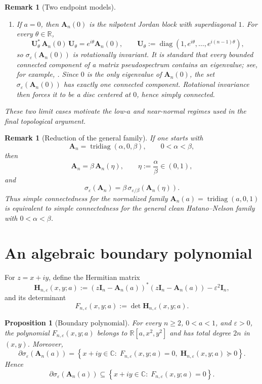 \documentclass[11pt]{article}
\newtheorem{proposition}[theorem]{Proposition}
\newtheorem{remark}[theorem]{Remark}
\DeclareMathOperator{\diag}{diag}
\DeclareMathOperator{\tridiag}{tridiag}
\newcommand{\R}{\mathbb{R}}
\newcommand{\C}{\mathbb{C}}
\begin{document}
\begin{remark}[Two endpoint models]
\begin{enumerate}
\item If \(a=0\), then \(\mathbf A_n(0)\) is the nilpotent Jordan block with superdiagonal \(1\). For every \(\theta\in\R\),
\[
\mathbf U_\theta^*\,\mathbf A_n(0)\,\mathbf U_\theta
=
e^{i\theta}\mathbf A_n(0),
\qquad
\mathbf U_\theta:=\diag(1,e^{i\theta},\dots,e^{i(n-1)\theta}),
\]
so \(\sigma_\varepsilon(\mathbf A_n(0))\) is rotationally invariant. It is standard that every bounded connected component of a matrix pseudospectrum contains an eigenvalue; see, for example, \cite{TrefethenEmbree2005}. Since \(0\) is the only eigenvalue of \(\mathbf A_n(0)\), the set \(\sigma_\varepsilon(\mathbf A_n(0))\) has exactly one connected component. Rotational invariance then forces it to be a disc centered at \(0\), hence simply connected.
\end{enumerate}

These two limit cases motivate the low-\(a\) and near-normal regimes used in the final topological argument.
\end{remark}

\begin{remark}[Reduction of the general family]\label{rem:general-b}
If one starts with
\[
\mathbf A_n=\tridiag(\alpha,0,\beta),
\qquad
0<\alpha<\beta,
\]
then
\[
\mathbf A_n=\beta\,\mathbf A_n(\eta),
\qquad
\eta:=\frac{\alpha}{\beta}\in(0,1),
\]
and
\[
\sigma_\varepsilon(\mathbf A_n)
=
\beta\,\sigma_{\varepsilon/\beta}(\mathbf A_n(\eta)).
\]
Thus simple connectedness for the normalized family \(\mathbf A_n(a)=\tridiag(a,0,1)\) is equivalent to simple connectedness for the general clean Hatano--Nelson family with \(0<\alpha<\beta\).
\end{remark}

\section{An algebraic boundary polynomial}

For \(z=x+iy\), define the Hermitian matrix
\[
\mathbf H_{n,\varepsilon}(x,y;a)
:=
(z\mathbf I_n-\mathbf A_n(a))^*(z\mathbf I_n-\mathbf A_n(a))
-\varepsilon^2\mathbf I_n,
\]
and its determinant
\[
F_{n,\varepsilon}(x,y;a)
:=
\det \mathbf H_{n,\varepsilon}(x,y;a).
\]

\begin{proposition}[Boundary polynomial]\label{prop:boundary-polynomial}
For every \(n\ge 2\), \(0<a<1\), and \(\varepsilon>0\), the polynomial \(F_{n,\varepsilon}(x,y;a)\) belongs to \(\R[a,x^2,y^2]\) and has total degree \(2n\) in \((x,y)\). Moreover,
\[
\partial \sigma_\varepsilon(\mathbf A_n(a))
=
\left\{
x+iy\in\C:\;
F_{n,\varepsilon}(x,y;a)=0,\;
\mathbf H_{n,\varepsilon}(x,y;a)\succeq 0
\right\}.
\]
Hence
\[
\partial \sigma_\varepsilon(\mathbf A_n(a))
\subseteq
\left\{
x+iy\in\C:\;
F_{n,\varepsilon}(x,y;a)=0
\right\}.
\]
\end{proposition}
\end{document}
